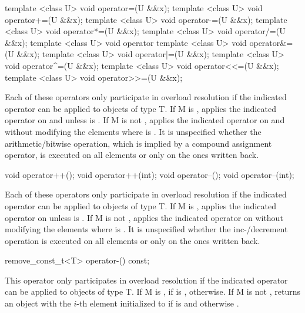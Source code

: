 \begin{itemdecl}
template <class U> void operator=(U &&x);
template <class U> void operator+=(U &&x);
template <class U> void operator-=(U &&x);
template <class U> void operator*=(U &&x);
template <class U> void operator/=(U &&x);
template <class U> void operator%
template <class U> void operator&=(U &&x);
template <class U> void operator|=(U &&x);
template <class U> void operator^=(U &&x);
template <class U> void operator<<=(U &&x);
template <class U> void operator>>=(U &&x);
\end{itemdecl}
\begin{itemdescr}
  \pnum\remarks Each of these operators only participate in overload resolution if the indicated operator can be applied to objects of type \type T.
  \pnum\effects
  If \type M is \bool, applies the indicated operator on  and  unless  is \false.
  If \type M is not \bool, applies the indicated operator on  and  without modifying the elements  where  is \false \foralli[M::].
  \pnum\remarks It is unspecified whether the arithmetic/bitwise operation, which is implied by a compound assignment operator, is executed on all elements or only on the ones written back.
\end{itemdescr}

\begin{itemdecl}
void operator++();
void operator++(int);
void operator--();
void operator--(int);
\end{itemdecl}
\begin{itemdescr}
  \pnum\remarks Each of these operators only participate in overload resolution if the indicated operator can be applied to objects of type \type T.
  \pnum\effects
  If \type M is \bool, applies the indicated operator on  unless  is \false.
  If \type M is not \bool, applies the indicated operator on  without modifying the elements  where  is \false \foralli[M::].
  \pnum\realnote It is unspecified whether the inc-/decrement operation is executed on all elements or only on the ones written back.
\end{itemdescr}

\begin{itemdecl}
remove_const_t<T> operator-() const;
\end{itemdecl}
\begin{itemdescr}
  \pnum\remarks This operator only participates in overload resolution if the indicated operator can be applied to objects of type \type T.
  \pnum\returns If \type M is \bool,  if  is \true,  otherwise.
  If \type M is not \bool, returns an object with the $i$-th element initialized to  if  is \true and  otherwise \foralli[M::].
\end{itemdescr}

